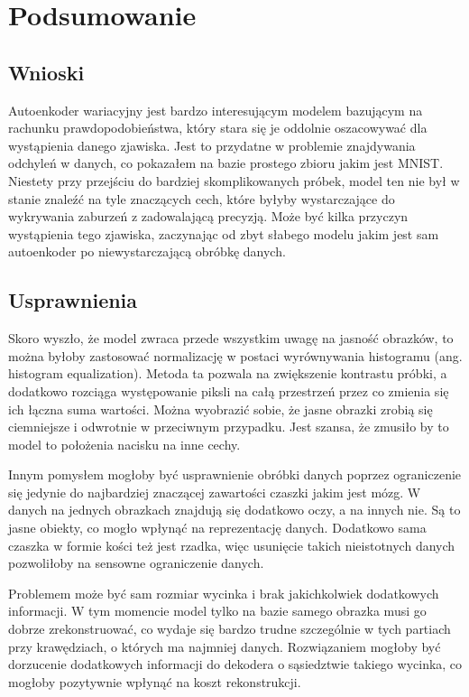 \chapter{Podsumowanie}

\section{Wnioski}

Autoenkoder wariacyjny jest bardzo interesującym modelem bazującym na rachunku prawdopodobieństwa, który stara się je oddolnie oszacowywać dla wystąpienia danego zjawiska. Jest to przydatne w problemie znajdywania odchyleń w danych, co pokazałem na bazie prostego zbioru jakim jest MNIST. Niestety przy przejściu do bardziej skomplikowanych próbek, model ten nie był w stanie znaleźć na tyle znaczących cech, które byłyby wystarczające do wykrywania zaburzeń z zadowalającą precyzją. Może być kilka przyczyn wystąpienia tego zjawiska, zaczynając od zbyt słabego modelu jakim jest sam autoenkoder po niewystarczającą obróbkę danych.


\section{Usprawnienia}

Skoro wyszło, że model zwraca przede wszystkim uwagę na jasność obrazków, to można byłoby zastosować normalizację w postaci wyrównywania histogramu (ang. histogram equalization). Metoda ta pozwala na zwiększenie kontrastu próbki, a dodatkowo rozciąga występowanie piksli na całą przestrzeń przez co zmienia się ich łączna suma wartości. Można wyobrazić sobie, że jasne obrazki zrobią się ciemniejsze i odwrotnie w przeciwnym przypadku. Jest szansa, że zmusiło by to model to położenia nacisku na inne cechy.

Innym pomysłem mogłoby być usprawnienie obróbki danych poprzez ograniczenie się jedynie do najbardziej znaczącej zawartości czaszki jakim jest mózg. W danych na jednych obrazkach znajdują się dodatkowo oczy, a na innych nie. Są to jasne obiekty, co mogło wpłynąć na reprezentację danych. Dodatkowo sama czaszka w formie kości też jest rzadka, więc usunięcie takich nieistotnych danych pozwoliłoby na sensowne ograniczenie danych.

Problemem może być sam rozmiar wycinka i brak jakichkolwiek dodatkowych informacji. W tym momencie model tylko na bazie samego obrazka musi go dobrze zrekonstruować, co wydaje się bardzo trudne szczególnie w tych partiach przy krawędziach, o których ma najmniej danych. Rozwiązaniem mogłoby być dorzucenie dodatkowych informacji do dekodera o sąsiedztwie takiego wycinka, co mogłoby pozytywnie wpłynąć na koszt rekonstrukcji.

